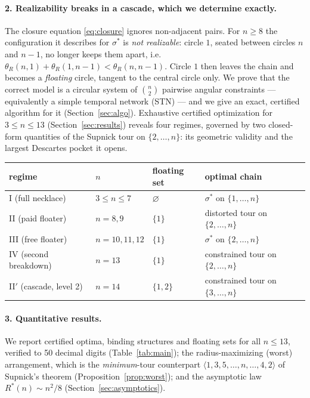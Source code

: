 \documentclass[11pt]{article}
\theoremstyle{definition}
\theoremstyle{remark}
\begin{document}
\paragraph{2. Realizability breaks in a cascade, which we determine exactly.}
The closure equation \eqref{eq:closure} ignores non-adjacent pairs. For $n\ge 8$ the configuration it describes for $\sigma^\ast$ is \emph{not realizable}: circle $1$, seated between circles $n$ and $n-1$, no longer keeps them apart, i.e.
\(\theta_R(n,1)+\theta_R(1,n-1) < \theta_R(n,n-1)\).
Circle $1$ then leaves the chain and becomes a \emph{floating} circle, tangent to the central circle only. We prove that the correct model is a circular system of $\binom n2$ pairwise angular constraints --- equivalently a simple temporal network (STN) --- and we give an exact, certified algorithm for it (Section~\ref{sec:algo}). Exhaustive certified optimization for $3\le n\le 13$ (Section~\ref{sec:results}) reveals four regimes, governed by two closed-form quantities of the Supnick tour on $\{2,\dots,n\}$: its geometric validity and the largest Descartes pocket it opens.

\begin{center}
\begin{tabular}{llll}
\toprule
regime & $n$ & floating set & optimal chain \\
\midrule
I (full necklace) & $3\le n\le 7$ & $\varnothing$ & $\sigma^\ast$ on $\{1,\dots,n\}$ \\
II (paid floater) & $n=8,9$ & $\{1\}$ & distorted tour on $\{2,\dots,n\}$ \\
III (free floater) & $n=10,11,12$ & $\{1\}$ & $\sigma^\ast$ on $\{2,\dots,n\}$ \\
IV (second breakdown) & $n=13$ & $\{1\}$ & constrained tour on $\{2,\dots,n\}$ \\
II$'$ (cascade, level 2) & $n=14$ & $\{1,2\}$ & constrained tour on $\{3,\dots,n\}$ \\
\bottomrule
\end{tabular}
\end{center}

\paragraph{3. Quantitative results.}
We report certified optima, binding structures and floating sets for all $n\le 13$, verified to 50 decimal digits (Table~\ref{tab:main}); the radius-maximizing (worst) arrangement, which is the \emph{minimum}-tour counterpart $\langle 1,3,5,\dots,n,\dots,4,2\rangle$ of Supnick's theorem (Proposition~\ref{prop:worst}); and the asymptotic law $R^\ast(n)\sim n^2/8$ (Section~\ref{sec:asymptotics}).
\end{document}
